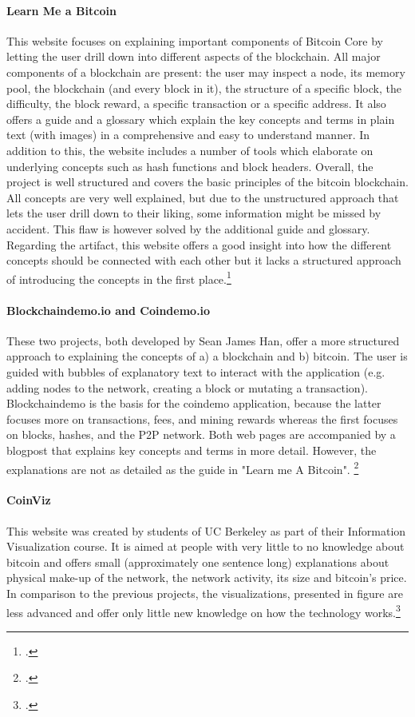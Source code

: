 \paragraph{Learn Me a Bitcoin} This website focuses on explaining important components of Bitcoin Core by letting the user drill down into different aspects of the blockchain. All major components of a blockchain are present: the user may inspect a node, its memory pool, the blockchain (and every block in it), the structure of a specific block, the difficulty, the block reward, a specific transaction or a specific address. It also offers a guide and a glossary which explain the key concepts and terms in plain text (with images) in a comprehensive and easy to understand manner. In addition to this, the website includes a number of tools which elaborate on underlying concepts such as hash functions and block headers. Overall, the project is well structured and covers the basic principles of the bitcoin blockchain. All concepts are very well explained, but due to the unstructured approach that lets the user drill down to their liking, some information might be missed by accident. This flaw is however solved by the additional guide and glossary. Regarding the artifact, this website offers a good insight into how the different concepts should be connected with each other but it lacks a structured approach of introducing the concepts in the first place.\footcite[Cf.][]{WalkerLearnmeBitcoin2016}

\paragraph{Blockchaindemo.io and Coindemo.io} These two projects, both developed by Sean James Han, offer a more structured approach to explaining the concepts of a) a blockchain and b) bitcoin. The user is guided with bubbles of explanatory text to interact with the application (e.g. adding nodes to the network, creating a block or mutating a transaction). Blockchaindemo is the basis for the coindemo application, because the latter focuses more on transactions, fees, and mining rewards whereas the first focuses on blocks, hashes, and the P2P network. Both web pages are accompanied by a blogpost that explains key concepts and terms in more detail. However, the explanations are not as detailed as the guide in "Learn me A Bitcoin".  \footcites[Cf.][]{HanHowdoesblockchain2017}[cf.][]{HanBlockchainDemo2017}[cf.][]{HanHowdoesbitcoin2017}[cf.][]{HanCoinDemo2017}

\paragraph{CoinViz} This website was created by students of UC Berkeley as part of their Information Visualization course. It is aimed at people with very little to no knowledge about bitcoin and offers small (approximately one sentence long) explanations about physical make-up of the network, the network activity, its size and bitcoin's price. In comparison to the previous projects, the visualizations, presented in figure  are less advanced and offer only little new knowledge on how the technology works.\footcite[Cf.][]{GiudiciCoinViz2016}

